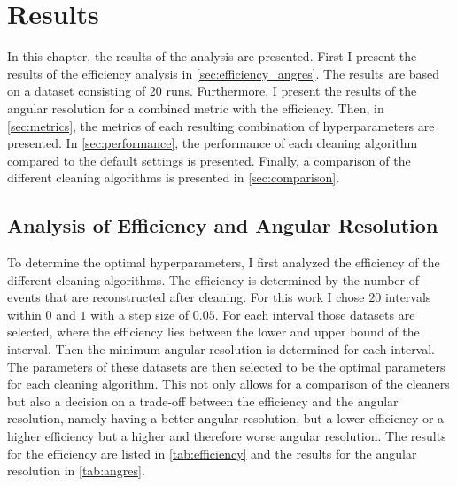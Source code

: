 \chapter{Results}
\label{ch:results}

In this chapter, the results of the analysis are presented. First I present the results of the
efficiency analysis in \autoref{sec:efficiency_angres}. The results are based on a dataset consisting of
20 runs. Furthermore, I present the results of the angular resolution for a combined metric with the efficiency.
Then, in \autoref{sec:metrics}, the metrics of each resulting combination of hyperparameters
are presented. In \autoref{sec:performance}, the performance of each cleaning algorithm compared
to the default settings is presented. Finally, a comparison of the different cleaning algorithms is
presented in \autoref{sec:comparison}.


\section{Analysis of Efficiency and Angular Resolution}
\label{sec:efficiency_angres}

To determine the optimal hyperparameters, I first analyzed the efficiency of the different cleaning algorithms.
The efficiency is determined by the number of events that are reconstructed after cleaning. For this work
I chose \(\num{20}\) intervals within \(\num{0}\) and \(\num{1}\) with a step size of \(\num{0.05}\).
For each interval those datasets are selected, where the efficiency lies between the lower and upper
bound of the interval. Then the minimum angular resolution is determined for each interval. The parameters
of these datasets are then selected to be the optimal parameters for each cleaning algorithm. This not
only allows for a comparison of the cleaners but also a decision on a trade-off between the efficiency
and the angular resolution, namely having a better angular resolution, but a lower efficiency or
a higher efficiency but a higher and therefore worse angular resolution.
The results for the efficiency are listed in \autoref{tab:efficiency} and the results for the angular
resolution in \autoref{tab:angres}.

